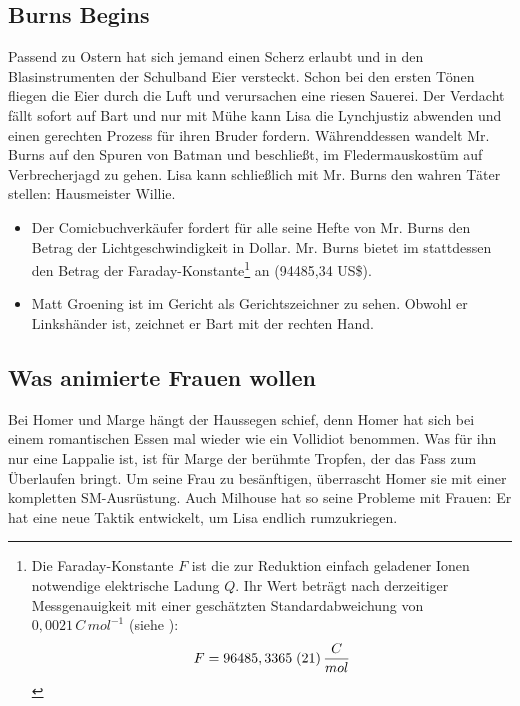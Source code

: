 \subsection{Burns Begins}
Passend zu Ostern hat sich jemand einen Scherz erlaubt und in den Blasinstrumenten der Schulband Eier versteckt. Schon bei den ersten Tönen fliegen die Eier durch die Luft und verursachen eine riesen Sauerei. Der Verdacht fällt sofort auf Bart und nur mit Mühe kann Lisa die Lynchjustiz abwenden und einen gerechten Prozess für ihren Bruder fordern. Währenddessen wandelt Mr. Burns auf den Spuren von Batman und beschließt, im Fledermauskostüm auf Verbrecherjagd zu gehen. Lisa kann schließlich mit Mr. Burns den wahren Täter stellen: Hausmeister Willie.

\begin{itemize}
  \item Der Comicbuchverkäufer fordert für alle seine Hefte von Mr. Burns den Betrag der Lichtgeschwindigkeit in Dollar. Mr. Burns bietet im stattdessen den Betrag der Faraday-Kon\-stan\-te\footnote{Die Faraday-Konstante $F$ ist die zur Reduktion einfach geladener Ionen notwendige elektrische Ladung $Q$. Ihr Wert beträgt nach derzeitiger Messgenauigkeit mit einer geschätzten Standardabweichung von $0,0021\, C\, {mol}^{-1}$ (siehe \cite{FaradayKonstante}):
		\[
F = 96 485,3365\;(21)\, \frac{C}{mol}\\
	\]
} an (94485,34 US\$).
	\item Matt Groening ist im Gericht als Gerichtszeichner zu sehen. Obwohl er Linkshänder ist, zeichnet er Bart mit der rechten Hand.
\end{itemize}

\subsection{Was animierte Frauen wollen}
Bei Homer und Marge hängt der Haussegen schief, denn Homer hat sich bei einem romantischen Essen mal wieder wie ein Vollidiot benommen. Was für ihn nur eine Lappalie ist, ist für Marge der berühmte Tropfen, der das Fass zum Überlaufen bringt. Um seine Frau zu besänftigen, überrascht Homer sie mit einer kompletten SM-Ausrüstung. Auch Milhouse hat so seine Probleme mit Frauen: Er hat eine neue Taktik entwickelt, um Lisa endlich rumzukriegen.


